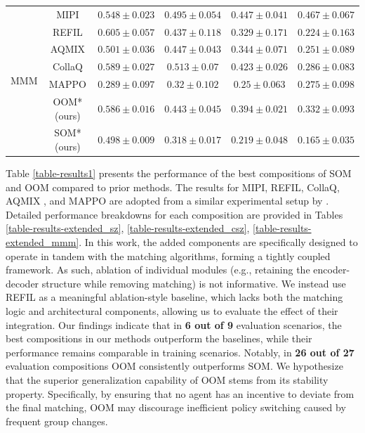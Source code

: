 \documentclass[10pt]{article} %
\begin{document}
\begin{table}[ht]
\begin{tabular}{cccccc}
\hline \multirow{7}{*}{MMM} & MIPI & $0.548 \pm 0.023$ & $0.495 \pm 0.054$ & $\mathbf{0.447} \pm 0.041$ & $\mathbf{0.467} \pm 0.067$ \\
\cline { 2 - 6 } & REFIL & $\mathbf{0.605} \pm 0.057$ & $0.437 \pm 0.118$ & $0.329 \pm 0.171$ & $0.224 \pm 0.163$ \\
\cline { 2 - 6 } & AQMIX & $0.501 \pm 0.036$ & $0.447 \pm 0.043$ & $0.344 \pm 0.071$ & $0.251 \pm 0.089$ \\
\cline { 2 - 6 } & CollaQ & $0.589 \pm 0.027$ & $\mathbf{0.513} \pm 0.07$ & $0.423 \pm 0.026$ & $0.286 \pm 0.083$ \\
\cline { 2 - 6 } & MAPPO & $0.289 \pm 0.097$ & $0.32 \pm 0.102$ & $0.25 \pm 0.063$ & $0.275 \pm 0.098$ \\
\cline { 2 - 6 } & OOM*(ours) & $0.586 \pm 0.016$ & $0.443 \pm 0.045$ & $0.394 \pm 0.021$ & $0.332 \pm 0.093$ \\ %
  \cline { 2 - 6 } & SOM*(ours) &  $0.498 \pm 0.009$ & $0.318 \pm 0.017$ & $0.219 \pm 0.048$ & $0.165 \pm 0.035$ \\ %
  \hline
\end{tabular}
\end{table}

Table \ref{table-results1} presents the performance of the best compositions of SOM and OOM compared to prior methods. The results for MIPI, REFIL, CollaQ, AQMIX \citep{iqbal2020ai}, and MAPPO \citep{yu2022surprising} are adopted from a similar experimental setup by \citet{ye2024mutual}. Detailed performance breakdowns for each composition are provided in Tables \ref{table-results-extended_sz}, \ref{table-results-extended_csz}, \ref{table-results-extended_mmm}.
In this work, the added components are specifically designed to operate in tandem with the matching algorithms, forming a tightly coupled framework. As such, ablation of individual modules (e.g., retaining the encoder-decoder structure while removing matching) is not informative. We instead use REFIL as a meaningful ablation-style baseline, which lacks both the matching logic and architectural components, allowing us to evaluate the effect of their integration.
Our findings indicate that in \textbf{6 out of 9} evaluation scenarios, the best compositions in our methods outperform the baselines, while their performance remains comparable in training scenarios. Notably, in \textbf{26 out of 27} evaluation compositions OOM consistently outperforms SOM.
We hypothesize that the superior generalization capability of OOM stems from its stability property. Specifically, by ensuring that no agent has an incentive to deviate from the final matching, OOM may discourage inefficient policy switching caused by frequent group changes. 
\end{document}
